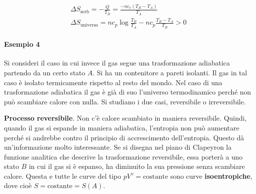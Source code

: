 \begin{gather*}
	\Delta S_{\text{serb} } = - \frac{Q}{T_B } = \frac{-nc_v(T_B-T_A)}{T_A} \\
	\Delta S_{\text{universo}} = nc_p\log \frac{T_B }{T_A } - nc_p\frac{T_B - T_A  }{T_B } > 0
\end{gather*}

\paragraph{Esempio 4} Si consideri il caso in cui invece il gas segue una trasformazione adiabatica partendo da un certo stato $A$. Si ha un contenitore a pareti isolanti. Il gas in tal caso è isolato termicamente rispetto al resto del mondo. Nel caso di una trasformazione adiabatica il gas è già di suo l'universo termodinamico perché non può scambiare calore con nulla. Si studiano i due casi, reversibile o irreversibile.

\textbf{Processo reversibile}. Non c'è calore scambiato in maniera reversibile. Quindi, quando il gas si espande in maniera adiabatica, l'entropia non può aumentare perché si andrebbe contro il principio di accrescimento dell'entropia. Questo dà un'informazione molto interessante. Se si disegna nel piano di Clapeyron la funzione analitica che descrive la trasformazione reversibile, essa porterà a uno stato $B$ in cui il gas si è espanso, ha diminuito la sua pressione senza scambiare calore. Questa e tutte le curve del tipo $pV^{\gamma}=\text{costante}$ sono curve \textbf{isoentropiche}, dove cioè $S=\text{costante}=S(A)$.

